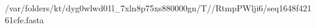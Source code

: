 \documentclass[10pt]{article}
\begin{document}
\begin{texshade}{/var/folders/kt/dyg0wlwd01l_7xln8p75xs880000gn/T//RtmpPWlji6/seq1648f42161cfe.fasta}
\hidelogoscale
{}
\showlegend
\end{texshade}
\end{document}
